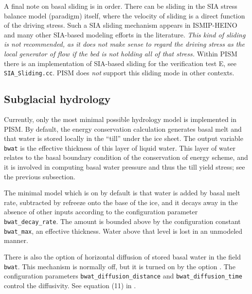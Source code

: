 A final note on basal sliding is in order.  There can be sliding in the SIA stress balance model (paradigm) itself, where the velocity of sliding is a direct function of the driving stress.  Such a SIA sliding mechanism appears in ISMIP-HEINO \cite{Calovetal2009HEINOfinal} and many other SIA-based modeling efforts in the literature.  \emph{This kind of sliding is not recommended, as it does not make sense to regard the driving stress as the local generator of flow if the bed is not holding all of that stress.}  Within PISM there is an implementation of SIA-based sliding for the verification test E, see \texttt{SIA_Sliding.cc}.  PISM does \emph{not} support this sliding mode in other contexts.  


\subsection{Subglacial hydrology}  \label{subsect:subhydro}

Currently, only the most minimal possible hydrology model is implemented in PISM.  By default, the energy conservation calculation generates basal melt and that water is stored locally in the ``till'' under the ice sheet.  The output variable \texttt{bwat} is the effective thickness of this layer of liquid water.  This layer of water relates to the basal boundary condition of the conservation of energy scheme, and it is involved in computing basal water pressure and thus the till yield stress; see the previous subsection.

The minimal model which is on by default is that water is added by basal melt rate, subtracted by refreeze onto the base of the ice, and it decays away in the absence of other inputs according to the configuration parameter \texttt{bwat_decay_rate}.  The amount is bounded above by the configuration constant \texttt{bwat_max}, an effective thickness.  Water above that level is lost in an unmodeled manner.

There is also the option of horizontal diffusion of stored basal water in the field \texttt{bwat}.  This mechanism is normally off, but it is turned on by the option .  The configuration parameters \texttt{bwat_diffusion_distance} and \texttt{bwat_diffusion_time} control the diffusivity.  See equation (11) in \cite{BBssasliding}.




